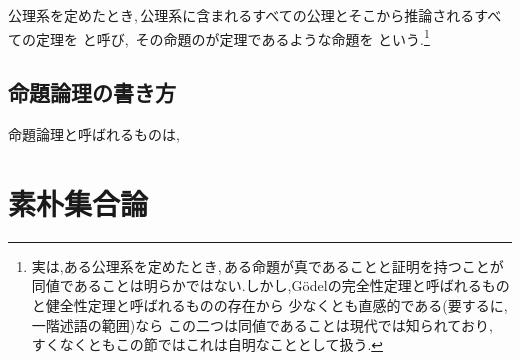 \documentclass[hyperref,a4paper,12pt]{kininaruki}
\begin{document}
公理系を定めたとき,\,公理系に含まれるすべての公理とそこから推論されるすべての定理を%
と呼び,\, %
その命題のが定理であるような命題を%
という.\footnote{実は,ある公理系を定めたとき,\,ある命題が真であることと証明を持つことが%
同値であることは明らかではない.しかし,G\"{o}delの完全性定理と呼ばれるものと健全性定理と呼ばれるものの存在から%
少なくとも直感的である(要するに,\, 一階述語の範囲)なら%
この二つは同値であることは現代では知られており,\, %
すくなくともこの節ではこれは自明なこととして扱う.}
\newpage
\subsection{命題論理の書き方}
命題論理と呼ばれるものは,
\section{素朴集合論}
\end{document}
